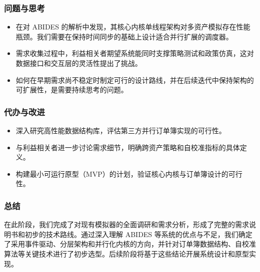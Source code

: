\subsubsection{问题与思考}

\begin{itemize}
  \item 在对 ABIDES 的解析中发现，其核心内核单线程架构对多资产模拟存在性能瓶颈。我们需要在保持时间同步的基础上设计适合并行扩展的调度器。
  \item 需求收集过程中，利益相关者期望系统能同时支撑策略测试和政策仿真，这对数据接口和交互层的灵活性提出了挑战。
  \item 如何在早期需求尚不稳定时制定可行的设计路线，并在后续迭代中保持架构的可扩展性，是需要持续思考的问题。
\end{itemize}

\subsubsection{代办与改进}

\begin{itemize}
  \item 深入研究高性能数据结构库，评估第三方并行订单簿实现的可行性。
  \item 与利益相关者进一步讨论需求细节，明确跨资产策略和自校准指标的具体定义。
  \item 构建最小可运行原型（MVP）的计划，验证核心内核与订单簿设计的可行性。
\end{itemize}

\subsubsection{总结}

在此阶段，我们完成了对现有模拟器的全面调研和需求分析，形成了完整的需求说明书和初步的技术路线。通过深入理解 ABIDES 等系统的优点与不足，我们确定了采用事件驱动、分层架构和并行化内核的方向，并针对订单簿数据结构、自校准算法等关键技术进行了初步选型。后续阶段将基于这些结论开展系统设计和原型实现。